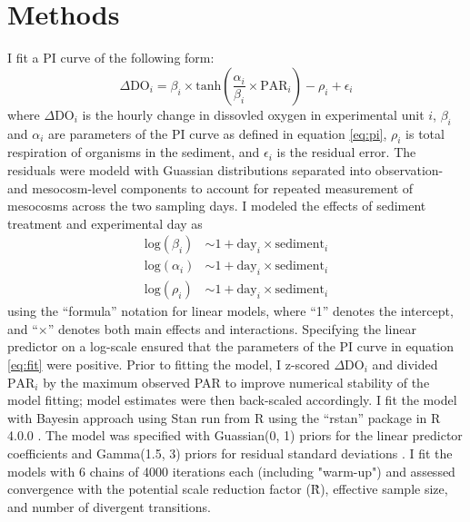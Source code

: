

\section*{Methods}

I fit a PI curve of the following form:
%
\begin{equation} \label{eq:fit}
  \Delta \text{DO}_i = 
    \beta_i \times \text{tanh}\left(\frac{\alpha_i} {\beta_i} \times \text{PAR}_i\right)
      - \rho_i + \epsilon_i
\end{equation}
%
where $\Delta \text{DO}_i$ is the hourly change in dissovled oxygen 
in experimental unit $i$, 
$\beta_i$ and $\alpha_i$ are parameters of the PI curve as defined in equation \ref{eq:pi},
$\rho_i$ is total respiration of organisms in the sediment,
and $\epsilon_i$ is the residual error.
The residuals were modeld with Guassian distributions 
separated into observation- and mesocosm-level components
to account for repeated measurement of mesocosms across the two sampling days.
I modeled the effects of sediment treatment and experimental day as
%
\begin{equation} \label{eq:lm}
\begin{split}
\text{log}(\beta_i) &\sim 1 + \text{day}_i \times \text{sediment}_i \\
\text{log}(\alpha_i) &\sim 1 + \text{day}_i \times \text{sediment}_i \\
\text{log}(\rho_i) &\sim 1 + \text{day}_i \times \text{sediment}_i
\end{split}
\end{equation}
%
using the ``formula'' notation for linear models, 
where ``1'' denotes the intercept,
and ``$\times$'' denotes both main effects and interactions.
Specifying the linear predictor on a log-scale ensured that the parameters 
of the PI curve in equation \ref{eq:fit} were positive.
Prior to fitting the model, I z-scored 
$\Delta \text{DO}_i$ and divided $\text{PAR}_i$ by the maximum observed PAR 
to improve numerical stability of the model fitting; 
model estimates were then back-scaled accordingly.
I fit the model with Bayesin approach using Stan \citep{carpenter2017}
run from R using the ``rstan'' package \citep{stan2018} in R 4.0.0 \citep{r}.
The model was specified with Guassian(0, 1) priors for the linear predictor coefficients  
and Gamma(1.5, 3) priors for residual standard deviations \citep{chung2015}.
I fit the models with 6 chains of 4000 iterations each (including "warm-up")
and assessed convergence with the potential scale reduction factor (\^{R}),
effective sample size, and number of divergent transitions.

